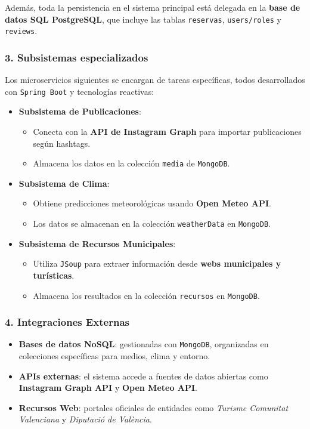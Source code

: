Además, toda la persistencia en el sistema principal está delegada en la \textbf{base de datos SQL PostgreSQL}, que incluye las tablas \texttt{reservas}, \texttt{users/roles} y \texttt{reviews}.

\subsubsection*{3. Subsistemas especializados}
Los microservicios siguientes se encargan de tareas específicas, todos desarrollados con \texttt{Spring Boot} y tecnologías reactivas:

\begin{itemize}
\item \textbf{Subsistema de Publicaciones}:
\begin{itemize}
\item Conecta con la \textbf{API de Instagram Graph} para importar publicaciones según hashtags.
\item Almacena los datos en la colección \texttt{media} de \texttt{MongoDB}.
\end{itemize}

\item \textbf{Subsistema de Clima}:
\begin{itemize}
    \item Obtiene predicciones meteorológicas usando \textbf{Open Meteo API}.
    \item Los datos se almacenan en la colección \texttt{weatherData} en \texttt{MongoDB}.
\end{itemize}

\item \textbf{Subsistema de Recursos Municipales}:
\begin{itemize}
    \item Utiliza \texttt{JSoup} para extraer información desde \textbf{webs municipales y turísticas}.
    \item Almacena los resultados en la colección \texttt{recursos} en \texttt{MongoDB}.
\end{itemize}
\end{itemize}

\subsubsection*{4. Integraciones Externas}
\begin{itemize}
\item \textbf{Bases de datos NoSQL}: gestionadas con \texttt{MongoDB}, organizadas en colecciones específicas para medios, clima y entorno.
\item \textbf{APIs externas}: el sistema accede a fuentes de datos abiertas como \textbf{Instagram Graph API} y \textbf{Open Meteo API}.
\item \textbf{Recursos Web}: portales oficiales de entidades como \textit{Turisme Comunitat Valenciana} y \textit{Diputació de València}.
\end{itemize}


